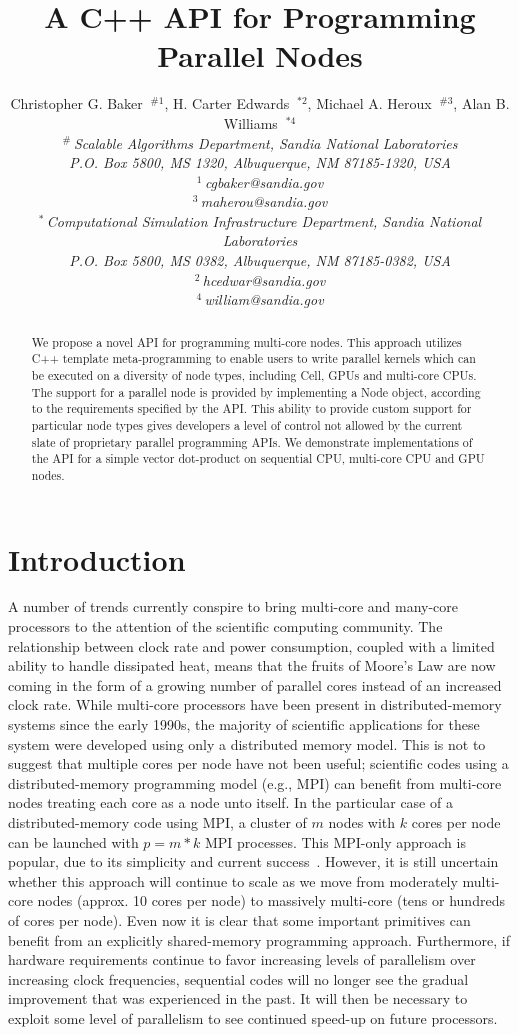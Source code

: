 \documentclass[10pt,conference,letterpaper]{IEEEtran}
\title{A C++ API for Programming Parallel Nodes}
\author{
{Christopher G. Baker {\small $~^{\#1}$}, H. Carter Edwards {\small $~^{*2}$}, Michael A. Heroux {\small $~^{\#3}$}, Alan B. Williams {\small $~^{*4}$} }%
\vspace{1.6mm}\\
\fontsize{10}{10}\selectfont\itshape
$^{\#}$\,Scalable Algorithms Department, Sandia National Laboratories\\
P.O. Box 5800, MS 1320, Albuquerque, NM 87185-1320, USA\\
\fontsize{9}{9}\selectfont\ttfamily\upshape
$^{1}$\,cgbaker@sandia.gov\\
$^{3}$\,maherou@sandia.gov%
\vspace{1.2mm}\\
\fontsize{10}{10}\selectfont\rmfamily\itshape
$^{*}$\,Computational Simulation Infrastructure Department, Sandia National Laboratories \\
P.O. Box 5800, MS 0382, Albuquerque, NM 87185-0382, USA\\
\fontsize{9}{9}\selectfont\ttfamily\upshape
$^{2}$\,hcedwar@sandia.gov\\
$^{4}$\,william@sandia.gov%
}
\begin{document}
\maketitle
%
\begin{abstract} 
We propose a novel API for programming multi-core nodes. This approach utilizes C++ template meta-programming to enable users to write parallel kernels which can be executed on a diversity of node types, including Cell, GPUs and multi-core CPUs. The support for a parallel node is provided by implementing a Node object, according to the requirements specified by the API. This ability to provide custom support for particular node types gives developers a level of control not allowed by the current slate of proprietary parallel programming APIs. We demonstrate implementations of the API for a simple vector dot-product on sequential CPU, multi-core CPU and GPU nodes.
\end{abstract}

%
\section{Introduction}
%

A number of trends currently conspire to bring multi-core and many-core processors to the attention of the scientific computing community. The relationship between clock rate and power consumption, coupled with a limited ability to handle dissipated heat, means that the fruits of Moore's Law are now coming in the form of a growing number of parallel cores instead of an increased clock rate. While multi-core processors have been present in distributed-memory systems since the early 1990s, the majority of scientific applications for these system were developed using only a distributed memory model. This is not to suggest that multiple cores per node have not been useful; scientific codes using a distributed-memory programming model (e.g., MPI) can benefit from multi-core nodes treating each core as a node unto itself. In the particular case of a distributed-memory code using MPI, a cluster of $m$ nodes with $k$ cores per node can be launched with $p=m*k$ MPI processes. This MPI-only approach is popular, due to its simplicity and current success~\cite{HerouxThoughts}. However, it is still uncertain whether this approach will continue to scale as we move from moderately multi-core nodes (approx. 10 cores per node) to massively multi-core (tens or hundreds of cores per node). Even now it is clear that some important primitives can benefit from an explicitly shared-memory programming approach. Furthermore, if hardware requirements continue to favor increasing levels of parallelism over increasing clock frequencies, sequential codes will no longer see the gradual improvement that was experienced in the past. It will then be necessary to exploit some level of parallelism to see continued speed-up on future processors. 
\end{document}
